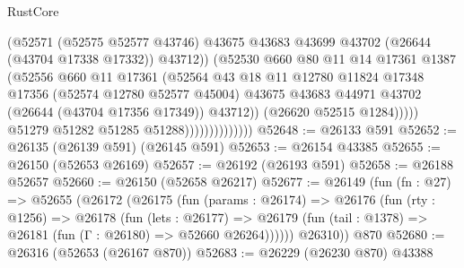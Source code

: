 \begin{lexlean}{RustCore}
\begin{coremodule}
                                        (@52571
                                          (@52575 @52577 @43746)
                                          @43675
                                          @43683
                                          @43699
                                          @43702
                                          (@26644 (@43704 @17338 @17332))
                                          @43712))
                                      (@52530
                                        @660
                                        @80
                                        @11
                                        @14
                                        @17361
                                        @1387
                                        (@52556
                                          @660
                                          @11
                                          @17361
                                          (@52564
                                            @43
                                            @18
                                            @11
                                            @12780
                                            @11824
                                            @17348
                                            @17356
                                            (@52574 @12780 @52577 @45004)
                                            @43675
                                            @43683
                                            @44971
                                            @43702
                                            (@26644 (@43704 @17356 @17349))
                                            @43712))
                                        (@26620 @52515 @1284)))))
                                @51279
                                @51282
                                @51285
                                @51288))))))))))))))
@52648 := @26133 @591
@52652 := @26135 (@26139 @591) (@26145 @591)
@52653 := @26154 @43385
@52655 := @26150 (@52653 @26169)
@52657 := @26192 (@26193 @591)
@52658 := @26188 @52657
@52660 := @26150 (@52658 @26217)
@52677 := @26149
    (fun (fn : @27) =>
    @52655
      (@26172
        (@26175
          (fun (params : @26174) =>
          @26176
            (fun (rty : @1256) =>
            @26178
              (fun (lets : @26177) =>
              @26179 (fun (tail : @1378) => @26181 (fun (Γ : @26180) => @52660 @26264))))))
        @26310))
    @870
@52680 := @26316 (@52653 (@26167 @870))
@52683 := @26229 (@26230 @870) @43388

\end{coremodule}
\end{lexlean}
